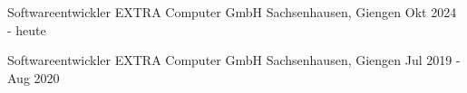 
\begin{cventries}
  \cventry
  {Softwareentwickler} %
  {EXTRA Computer GmbH} %
  {Sachsenhausen, Giengen} %
  {Okt 2024 - heute} %
  {
  }

  \cventry
  {Softwareentwickler} %
  {EXTRA Computer GmbH} %
  {Sachsenhausen, Giengen} %
  {Jul 2019 - Aug 2020} %
  {
  }


\end{cventries}
